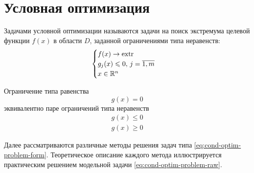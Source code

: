 \section{Условная оптимизация}

Задачами условной оптимизации называются задачи на поиск экстремума
целевой функции $f(x)$ в области $D$, заданной ограничениями типа
неравенств:
\begin{equation}
  \label{eq:cond-optim-problem-form}
  \begin{cases}
    f(x) \to \operatorname{extr} \\
    g_j(x) \leqslant 0,\, j=\overline{1,m} \\
    x \in \mathbb{R}^n
  \end{cases}
\end{equation}

\begin{rem}
  \label{rem:eq-noneq}
  Ограничение типа равенства
  \begin{equation*}
    g(x) = 0
  \end{equation*}
  эквивалентно паре ограничений типа неравенств
  \begin{align*}
    g(x) \leq 0 \\
    g(x) \geq 0
  \end{align*}
\end{rem}

Далее рассматриваются различные методы решения задач типа
\eqref{eq:cond-optim-problem-form}. Теоретическое описание каждого
метода иллюстрируется практическим решением модельной задачи
\eqref{eq:cond-optim-problem-raw}.



\clearpage


\clearpage

